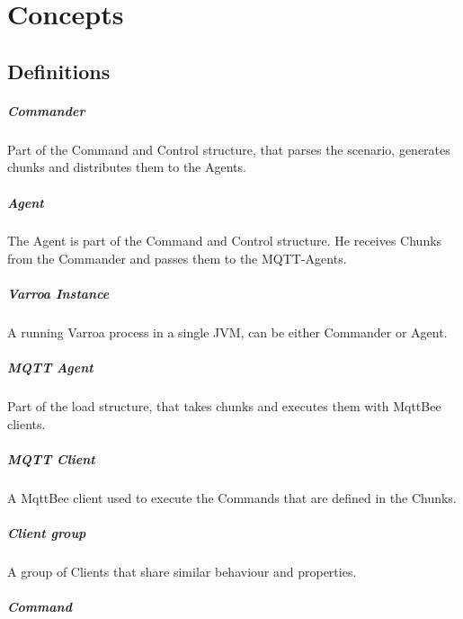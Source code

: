\chapter{Concepts}

\section{Definitions}

\paragraph{Commander}
Part of the Command and Control structure, that parses the scenario, generates chunks and distributes them to the Agents.

\paragraph{Agent}
The Agent is part of the Command and Control structure.
He receives Chunks from the Commander and passes them to the MQTT-Agents.

\paragraph{Varroa Instance}
A running Varroa process in a single JVM, can be either Commander or Agent.

\paragraph{MQTT Agent}
Part of the load structure, that takes chunks and executes them with MqttBee clients.

\paragraph{MQTT Client}
A MqttBee client used to execute the Commands that are defined in the Chunks.

\paragraph{Client group}
A group of Clients that share similar behaviour and properties.

\paragraph{Command}

